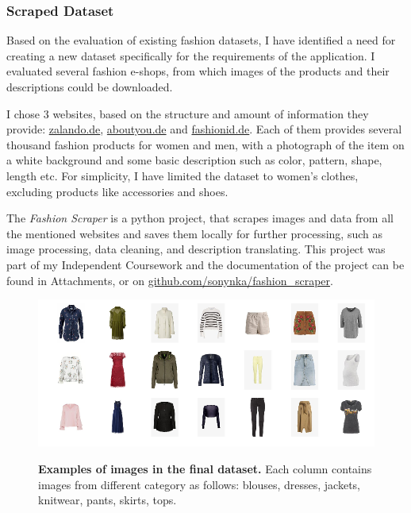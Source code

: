 \documentclass{article}
\begin{document}
\pagebreak
\subsubsection{Scraped Dataset}
Based on the evaluation of existing fashion datasets, I have identified a need for creating a new dataset specifically for the requirements of the application. I evaluated several fashion e-shops, from which images of the products and their descriptions could be downloaded. 

I chose 3 websites, based on the structure and amount of information they provide: \href{https://www.zalando.de/damen-home/}{zalando.de}, \href{https://www.aboutyou.de/}{aboutyou.de} and \href{https://www.fashionid.de/damen/}{fashionid.de}. Each of them provides several thousand fashion products for women and men, with a photograph of the item on a white background and some basic description such as color, pattern, shape, length etc. For simplicity, I have limited the dataset to women's clothes, excluding products like accessories and shoes.

The \textit{Fashion Scraper} is a python project, that scrapes images and data from all the mentioned websites and saves them locally for further processing, such as image processing, data cleaning, and description translating. This project was part of my Independent Coursework and the documentation of the project can be found in Attachments, or on \href{https://github.com/sonynka/fashion_scraper}{github.com/sonynka/fashion\_scraper}.

\begin{figure}[h]
\centering
{\includegraphics[width=\linewidth]{dataset_examples/img_grid2}}
\caption{\label{fig:dataset} \textbf{Examples of images in the final dataset.} Each column contains images from different category as follows: blouses, dresses, jackets, knitwear, pants, skirts, tops.}
\end{figure}
\end{document}
